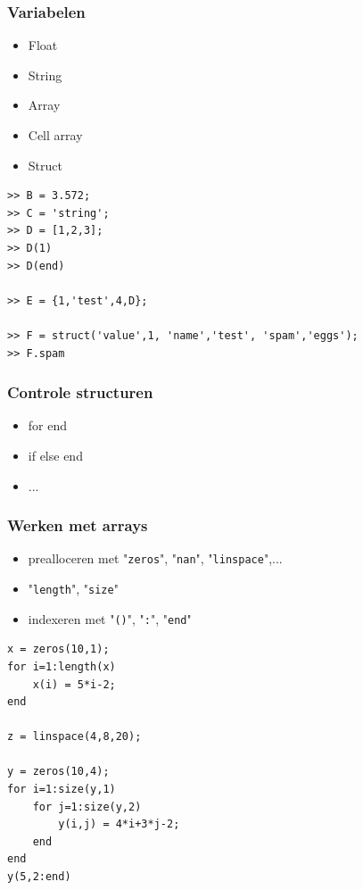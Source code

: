 \documentclass[t]{beamer}
\begin{document}
\begin{frame}[fragile]
	\frametitle{Variabelen}

	\begin{itemize}
		\item Float
		\item String
		\item Array
		\item Cell array
		\item Struct
	\end{itemize}
	
	\begin{lstlisting}
>> B = 3.572;
>> C = 'string';
>> D = [1,2,3];
>> D(1)
>> D(end)

>> E = {1,'test',4,D};

>> F = struct('value',1, 'name','test', 'spam','eggs');
>> F.spam
	\end{lstlisting}
	
\end{frame}
\begin{frame}
	\frametitle{Controle structuren}
	
	\begin{itemize}
		\item for  end
		\item if  else  end
		\item ...
	\end{itemize}
	
	\vspace{1cm}
		
	
\end{frame}
\begin{frame}[fragile]
	\frametitle{Werken met arrays}
	
	\begin{itemize}
		\item prealloceren met "\lstinline{zeros}", "\lstinline{nan}", "\lstinline{linspace}",...
		\item "\lstinline{length}", "\lstinline{size}"
		\item indexeren met "\lstinline{()}", "\lstinline{:}", "\lstinline{end}"
	\end{itemize}
	
	\begin{lstlisting}
x = zeros(10,1);
for i=1:length(x)
    x(i) = 5*i-2;
end

z = linspace(4,8,20);

y = zeros(10,4);
for i=1:size(y,1)
	for j=1:size(y,2)
    	y(i,j) = 4*i+3*j-2;
    end
end
y(5,2:end)
	\end{lstlisting}
\end{frame}
\end{document}
